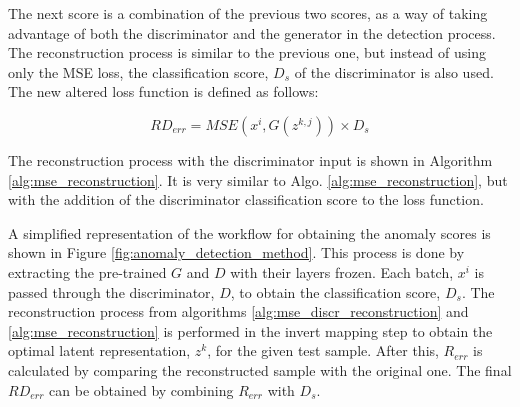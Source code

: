 The next score is a combination of the previous two scores, as a way of taking advantage of both the discriminator and the generator in the detection process. The reconstruction process is similar to the previous one, but instead of using only the MSE loss, the classification score, $D_{s}$ of the discriminator is also used. The new altered loss function is defined as follows:

\begin{equation}
    RD_{err} = MSE(x^i, G(z^{k,j})) \times D_{s}
\end{equation}

The reconstruction process with the discriminator input is shown in Algorithm \ref{alg:mse_reconstruction}. It is very similar to Algo. \ref{alg:mse_reconstruction}, but with the addition of the discriminator classification score to the loss function.
\\

\noindent{}


A simplified representation of the workflow for obtaining the anomaly scores is shown in Figure \ref{fig:anomaly_detection_method}. This process is done by extracting the pre-trained $G$ and $D$ with their layers frozen. Each batch, $x^i$ is passed through the discriminator, $D$, to obtain the classification score, $D_s$. The reconstruction process from algorithms \ref{alg:mse_discr_reconstruction} and \ref{alg:mse_reconstruction} is performed in the invert mapping step to obtain the optimal latent representation, $z^k$, for the given test sample. After this, $R_{err}$ is calculated by comparing the reconstructed sample with the original one. The final $RD_{err}$ can be obtained by combining $R_{err}$ with $D_s$.


